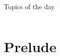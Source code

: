 
\begin{frame}
    \titlepage
\end{frame}
\makeatletter
    \setcounter{section}{-1\relax}%
    \relax\space
\makeatother
\begin{frame}{Topics of the day}
    \medskip
    \begin{columns}[t]
        \begin{column}{.45\textwidth}
            \hspace*{4mm}
            \begin{minipage}[t][0.6\textheight]{\textwidth}
                \tableofcontents[currentsection,sections={0}]
                \vspace{-7.7mm}
                \tableofcontents[sections={1-3}]
            \end{minipage}
        \end{column}
        \begin{column}{.45\textwidth}
            \begin{minipage}[t][0.6\textheight]{\textwidth}
                \tableofcontents[sections={4-}]
            \end{minipage}
        \end{column}
    \end{columns}
\end{frame}
\section{Prelude} %
